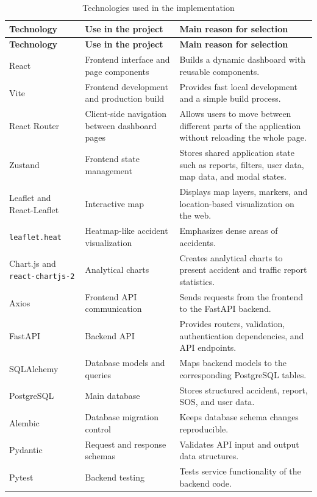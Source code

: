 ﻿\documentclass[12pt,a4paper]{report}
\begin{document}
\renewcommand{\arraystretch}{1.2}
\begin{longtable}{|p{3.4cm}|p{4.7cm}|p{6.5cm}|}
\caption{\centering Technologies used in the implementation}
\label{tab:implementation_technologies} \\
\hline
\textbf{Technology} & \textbf{Use in the project} & \textbf{Main reason for selection} \\
\hline
\endfirsthead
\hline
\textbf{Technology} & \textbf{Use in the project} & \textbf{Main reason for selection} \\
\hline
\endhead
React & Frontend interface and page components & Builds a dynamic dashboard with reusable components. \\
\hline
Vite & Frontend development and production build & Provides fast local development and a simple build process. \\
\hline
React Router & Client-side navigation between dashboard pages & Allows users to move between different parts of the application without reloading the whole page. \\
\hline
Zustand & Frontend state management & Stores shared application state such as reports, filters, user data, map data, and modal states. \\
\hline
Leaflet and React-Leaflet & Interactive map & Displays map layers, markers, and location-based visualization on the web. \\
\hline
\texttt{leaflet.heat} & Heatmap-like accident visualization & Emphasizes dense areas of accidents. \\
\hline
Chart.js and \texttt{react-chartjs-2} & Analytical charts & Creates analytical charts to present accident and traffic report statistics. \\
\hline
Axios & Frontend API communication & Sends requests from the frontend to the FastAPI backend. \\
\hline
FastAPI & Backend API & Provides routers, validation, authentication dependencies, and API endpoints. \\
\hline
SQLAlchemy & Database models and queries & Maps backend models to the corresponding PostgreSQL tables. \\
\hline
PostgreSQL & Main database & Stores structured accident, report, SOS, and user data. \\
\hline
Alembic & Database migration control & Keeps database schema changes reproducible. \\
\hline
Pydantic & Request and response schemas & Validates API input and output data structures. \\
\hline
Pytest & Backend testing & Tests service functionality of the backend code. \\
\hline
\end{longtable}
\end{document}
